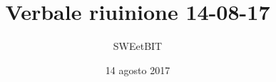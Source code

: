 


\usepackage{ragged2e}

\title{\textbf{Verbale riuinione 14-08-17}}
\author{SWEetBIT}

\date{14 agosto 2017}




\makeFrontPage

\tableofcontents






